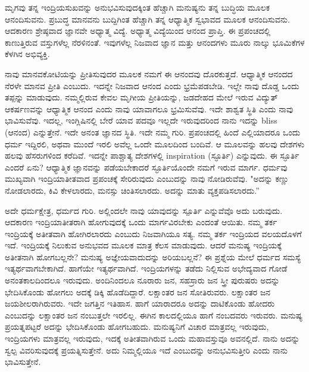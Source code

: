 ಮೃಗವು ತನ್ನ ಇಂದ್ರಿಯಸುಖವನ್ನು ಅನುಭವಿಸುವುದಕ್ಕಿಂತ ಹೆಚ್ಚಾಗಿ ಮನುಷ್ಯನು ತನ್ನ ಬುದ್ಧಿಯ ಮೂಲಕ ಆನಂದಿಸುವನು. ಪ್ರಬುದ್ಧ ಮಾನವನು ಬುದ್ದಿಗಿಂತ ಹೆಚ್ಚಾಗಿ ತನ್ನ ಆಧ್ಯಾತ್ಮಿಕ ಸ್ವಭಾವದ ಮೂಲಕ ಆನಂದಿಸುವನು. ಆದಕಾರಣ ಶ್ರೇಷ್ಠವಾದ ಜ್ಞಾನವೇ ಅಧ್ಯಾತ್ಮ ವಿದ್ಯೆ. ಅಧ್ಯಾತ್ಮ ವಿದ್ಯೆಯಿಂದ ಆನಂದ ಪ್ರಾಪ್ತಿ. ಈ ಪ್ರಪಂಚದಲ್ಲಿ ಕಾಣುತ್ತಿರುವ ವಸ್ತುಗಳೆಲ್ಲ ನೆರಳಿನಂತೆ. ಇವುಗಳೆಲ್ಲ ನಿಜವಾದ ಜ್ಞಾನ ಮತ್ತು ಆನಂದಗಳು ಮೂರು ನಾಲ್ಕು ಭೂಮಿಕೆಗಳ ಕೆಳಗಿನ ಅಭಿವ್ಯಕ್ತಿ.

ನಾವು ಮಾನವಕೋಟಿಯನ್ನು ಪ್ರೀತಿಸುವುದರ ಮೂಲಕ ನಮಗೆ ಈ ಆನಂದವು ದೊರಕುತ್ತದೆ. ಆಧ್ಯಾತ್ಮಿಕ ಆನಂದದ ನೆರಳೇ ಮಾನವ ಪ್ರೀತಿ ಎಂಬುದು. ಇದನ್ನೇ ನಿಜವಾದ ಆನಂದ ಎಂದು ಭ್ರಮೆಪಡಬೇಡಿ. ಇಲ್ಲೇ ನಾವು ದೊಡ್ಡ ಒಂದು ತಪ್ಪನ್ನು ಮಾಡುವುದು. ನಮ್ಮಲ್ಲಿರುವ ಕೇವಲ ಮೃಗೀಯ ಪ್ರೀತಿಯನ್ನು, ಜಡದೇಹದ ಮೇಲೆ ಇರುವ ವಿದ್ಯುತ್ ಆಕರ್ಷಣವನ್ನು ಆಧ್ಯಾತ್ಮಿಕ ಆನಂದ ಎಂದು ನಾವು ಯಾವಾಗಲೂ ಭ್ರಮಿಸುವೆವು. ಇದೇ ಶಾಶ್ವತ ಸ್ಥಿತಿ ಎಂದು ನಾವು ಭಾವಿಸುವೆವು. ಇದಲ್ಲ, ಇಂಗ್ಲಿಷಿನಲ್ಲಿ ಬೇರೆ ಯಾವ ಪದವೂ ಇಲ್ಲದೇ ಇರುವುದರಿಂದ ನಾನು ಇದನ್ನು bliss (ಆನಂದ) ಎನ್ನುತ್ತೇನೆ. ಇದೇ ಅನಂತ ಜ್ಞಾನದ ಸ್ಥಿತಿ. ಇದೇ ನಮ್ಮ ಗುರಿ. ಪ್ರಪಂಚದಲ್ಲಿ ಹಿಂದೆ ಎಲ್ಲಿಯಾದರೂ ಒಂದು ಧರ್ಮ ಇದ್ದಿರಲಿ, ಅಥವಾ ಮುಂದೆ ಇರಲಿ ಅವೆಲ್ಲ ಒಂದೇ ಮೂಲದಿಂದ ಬಂದಿವೆ. ಆ ಮೂಲವನ್ನು ಹಲವು ದೇಶಗಳು ಹಲವು ಹೆಸರುಗಳಿಂದ ಕರೆದಿವೆ. ಇದನ್ನೇ ಪಾಶ್ಚಾತ್ಯ ದೇಶಗಳಲ್ಲಿ inspiration (ಸ್ಫೂರ್ತಿ) ಎನ್ನುವುದು. ಈ ಸ್ಫೂರ್ತಿ ಎಂದರೆ ಏನು? ಆಧ್ಯಾತ್ಮಿಕ ಜ್ಞಾನವನ್ನು ಪಡೆಯಬೇಕಾದರೆ ಸ್ಫೂರ್ತಿಯೊಂದೇ ನಮಗೆ ಇರುವ ಮಾರ್ಗ. ಧರ್ಮವು ಮುಖ್ಯವಾಗಿ ಇಂದ್ರಿಯಾತೀತವಾದ ಪ್ರಪಂಚಕ್ಕೆ ಸೇರಿರುವುದು ಎಂಬುದನ್ನು ನಾವು ನೋಡಿರುವೆವು. "ಅದನ್ನು ಕಣ್ಣು ನೋಡಲಾರದು, ಕಿವಿ ಕೇಳಲಾರದು, ಮನಸ್ಸು ಚಿಂತಿಸಲಾರದು. ಅದನ್ನು ಮಾತು ವ್ಯಕ್ತಪಡಿಸಲಾರದು.”

ಅದೇ ಧರ್ಮಕ್ಷೇತ್ರ, ಧರ್ಮದ ಗುರಿ. ಅಲ್ಲಿಂದಲೇ ನಾವು ಯಾವುದನ್ನು ಸ್ಪೂರ್ತಿ ಎನ್ನುವೆವೊ ಅದು ಬರುವುದು. ಆದಕಾರಣ ಇಂದ್ರಿಯಾತೀತರಾಗಿ ಹೋಗುವುದಕ್ಕೆ ಒಂದು ಮಾರ್ಗವಿರಬೇಕು ಎಂದಂತೆ ಆಯಿತು. ನಮ್ಮ ತರ್ಕ ಇಂದ್ರಿಯಕ್ಕೆ ಅತೀತವಾಗಿ ಹೋಗಿರಲಾರದು ಎಂಬುದು ನಿಜವಾಗಿಯೂ ಸತ್ಯ. ನಮ್ಮ ತರ್ಕ ಇಂದ್ರಿಯದ ವಲಯದೊಳಗೆ ಇದೆ. ಇಂದ್ರಿಯಕ್ಕೆ ನಿಲುಕುವ ಅನುಭವದ ಮೂಲಕ ಮಾತ್ರ ಕೆಲಸ ಮಾಡುವುದು. ಆದರೆ ಮನುಷ್ಯ ಇಂದ್ರಿಯಕ್ಕೆ ಅತೀತನಾಗಿ ಹೋಗಬಲ್ಲನೇ? ಮನುಷ್ಯ ಅಜ್ಞೇಯವಾದುದನ್ನು ಅರಿಯಬಲ್ಲನೆ? ಈ ಪ್ರಶ್ನೆಯ ಮೇಲೆ ಧರ್ಮದ ಸಮಸ್ಯೆ ಇತ್ಯರ್ಥವಾಗಬೇಕಾಗಿದೆ. ಹಾಗೆಯೇ ಇತ್ಯರ್ಥವಾಗಿದೆ. ಇಂದ್ರಿಯಗಳನ್ನು ತಡೆದು ನಿಲ್ಲಿಸುವ ಅಭೇದ್ಯವಾದ ಗೋಡೆ ಅನಂತಕಾಲದಿಂದಲೂ ಇರುವುದು. ಅಂದಿನಿಂದಲೂ ನೂರಾರು ಜನ, ಸಹಸ್ರಾರು ಜನ ಸ್ತ್ರೀ ಪುರುಷರು ಅದನ್ನು ಭೇದಿಸಿಕೊಂಡು ಹೋಗಲು ಅದಕ್ಕೆ ಡಿಕ್ಕಿ ಹೊಡೆದಿದ್ದಾರೆ. ಲಕ್ಷಾಂತರ ಜನ ಸೋತಿರುವರು. ಲಕ್ಷಾಂತರ ಜನ ಜಯಶೀಲರಾಗಿರುವರು. ಇದೇ ಜಗತ್ತಿನ ಇತಿಹಾಸ. ಹಾಗೆ ಯಾರಾದರೂ ಅದನ್ನು ದಾಟಿಕೊಂಡು ಹೋದರು ಎಂಬುದನ್ನು ಲಕ್ಷಾಂತರ ಜನ ನಂಬುತ್ತಲೇ ಇರಲಿಲ್ಲ. ಈಗಿನ ಕಾಲದಲ್ಲಿಯೂ ಹಾಗೆ ನಂಬದವರು ಇರುವರು. ಮನುಷ್ಯ ಪ್ರಯತ್ನಪಟ್ಟರೆ ಅದನ್ನು ಭೇದಿಸಿಕೊಂಡು ಹೋಗಬಹುದು. ಮನುಷ್ಯನಿಗೆ ವಿಚಾರ ಮಾತ್ರವಲ್ಲ ಇರುವುದು, ಇಂದ್ರಿಯಗಳು ಮಾತ್ರವಲ್ಲ ಇರುವುದು, ಇದಕ್ಕೆ ಅತೀತವಾಗಿರುವ ಒಂದು ಮಹಾವಸ್ತುವೂ ಅವನಲ್ಲಿದೆ. ನಾನು ಅದನ್ನು ಸ್ವಲ್ಪ ವಿವರಿಸುವುದಕ್ಕೆ ಪ್ರಯತ್ನಿಸುತ್ತೇನೆ. ಅದು ನಿಮ್ಮಲ್ಲಿಯೂ ಇದೆ ಎಂಬುದನ್ನು ಅನುಭವಿಸುತ್ತೀರಿ ಎಂದು ನಾನು ಭಾವಿಸುತ್ತೇನೆ.

